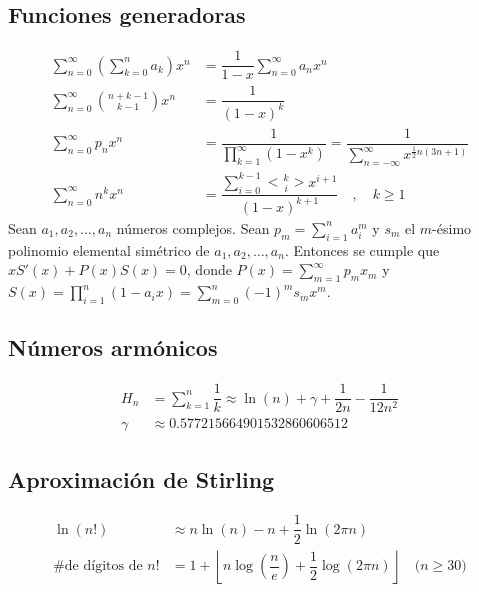 \documentclass[11pt]{article}
\newcommand{\genEuler}[3]{%
	\genfrac{<}{>}{0pt}{#1}{#2}{#3}%
}
\newcommand{\euler}[2]{\genEuler{}{#1}{#2}}
\begin{document}
		\subsection{Funciones generadoras}
			\begin{align*}
				\sum_{n=0}^{\infty} \left( \sum_{k=0}^{n}a_k \right) x^n &= \dfrac{1}{1-x}\sum_{n=0}^{\infty} a_n x^n \\
				\sum_{n=0}^{\infty} \binom{n+k-1}{k-1}x^n &= \dfrac{1}{\left(1-x\right)^k} \\
				\sum_{n=0}^{\infty} p_n x^n &= \dfrac{1}{\displaystyle \prod_{k=1}^{\infty}(1-x^k)} = \dfrac{1}{\displaystyle \sum_{n=-\infty}^{\infty} x^{\frac{1}{2}n(3n+1)}} \\
				\sum_{n=0}^{\infty} n^k x^n &= \dfrac{\displaystyle \sum_{i=0}^{k-1} \euler{k}{i} x^{i+1}}{(1-x)^{k+1}} \quad , \quad k \geq 1
			\end{align*}
			Sean $a_1, a_2, \ldots, a_n$ números complejos. Sean $p_m = \displaystyle \sum_{i=1}^{n} a_i^m$ y $s_m$ el $m$-ésimo polinomio elemental simétrico de $a_1, a_2, \ldots, a_n$. Entonces se cumple que $xS'(x) + P(x)S(x) = 0$, donde $P(x)=\displaystyle \sum_{m=1}^{\infty} p_m x_m$ y $S(x)=\displaystyle \prod_{i=1}^{n}(1-a_ix) = \sum_{m=0}^{n}(-1)^m s_m x^m$.
		
		\subsection{Números armónicos}
			\begin{align*}
				H_n &= \sum_{k=1}^{n} \dfrac{1}{k} \approx \ln(n) + \gamma + \dfrac{1}{2n} - \dfrac{1}{12n^2} \\
				\gamma &\approx 0.577215664901532860606512
			\end{align*}
		
		\subsection{Aproximación de Stirling}
			\begin{align*}
				\ln(n!) &\approx n\ln(n) - n + \dfrac{1}{2}\ln(2 \pi n) \\
				\text{\# de dígitos de $n!$} &= 1 + \left\lfloor n\log\left(\dfrac{n}{e}\right) + \dfrac{1}{2}\log(2 \pi n) \right\rfloor \quad \text{($n \geq 30$)}
			\end{align*}
		
\end{document}
